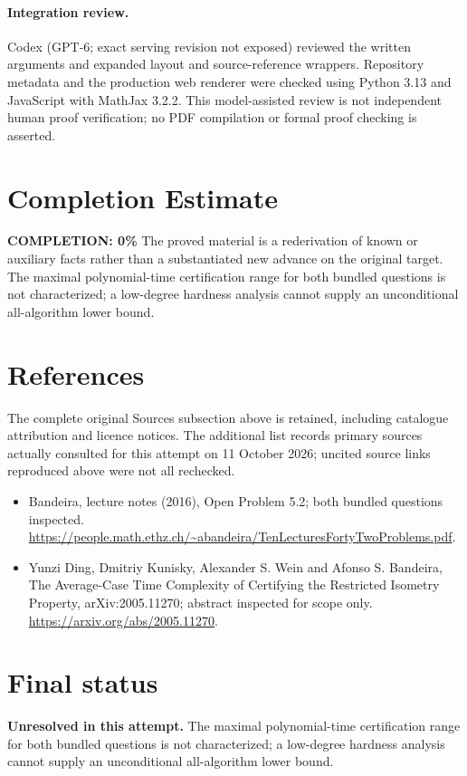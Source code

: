 \documentclass[11pt]{article}
\begin{document}
\paragraph{Integration review.} Codex (GPT-6; exact serving revision not exposed) reviewed the written arguments and expanded layout and source-reference wrappers. Repository metadata and the production web renderer were checked using Python 3.13 and JavaScript with MathJax 3.2.2. This model-assisted review is not independent human proof verification; no PDF compilation or formal proof checking is asserted.

\section{Completion Estimate}
\noindent\textbf{COMPLETION: 0\%}
The proved material is a rederivation of known or auxiliary facts rather than a substantiated new advance on the original target. The maximal polynomial-time certification range for both bundled questions is not characterized; a low-degree hardness analysis cannot supply an unconditional all-algorithm lower bound.
\section{References}
The complete original Sources subsection above is retained, including catalogue attribution and licence notices. The additional list records primary sources actually consulted for this attempt on 11 October 2026; uncited source links reproduced above were not all rechecked.
\begin{itemize}
\item Bandeira, lecture notes (2016), Open Problem 5.2; both bundled questions inspected. \url{https://people.math.ethz.ch/~abandeira/TenLecturesFortyTwoProblems.pdf}.
\item Yunzi Ding, Dmitriy Kunisky, Alexander S. Wein and Afonso S. Bandeira, The Average-Case Time Complexity of Certifying the Restricted Isometry Property, arXiv:2005.11270; abstract inspected for scope only. \url{https://arxiv.org/abs/2005.11270}.
\end{itemize}
\section{Final status}
\textbf{Unresolved in this attempt.} The maximal polynomial-time certification range for both bundled questions is not characterized; a low-degree hardness analysis cannot supply an unconditional all-algorithm lower bound.
\end{document}

